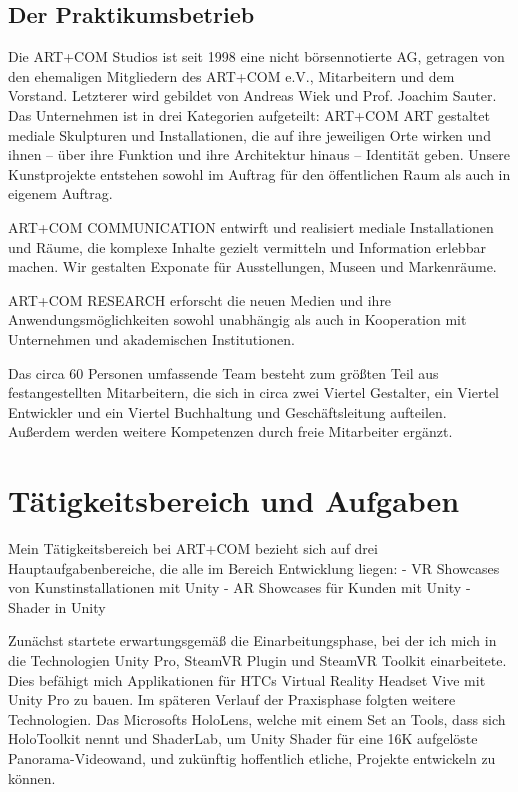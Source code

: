 \documentclass[a4paper,12pt]{scrartcl}
\begin{document}
\subsection{Der Praktikumsbetrieb}
Die ART+COM Studios ist seit 1998 eine nicht börsennotierte AG, getragen von den ehemaligen Mitgliedern des ART+COM e.V., Mitarbeitern und dem Vorstand. Letzterer wird gebildet von Andreas Wiek und Prof. Joachim Sauter.
\newline
Das Unternehmen ist in drei Kategorien aufgeteilt:
\newline
\newline
ART+COM ART gestaltet mediale Skulpturen und Installationen, die auf ihre jeweiligen Orte wirken und ihnen – über ihre Funktion und ihre Architektur hinaus – Identität geben. Unsere Kunstprojekte entstehen sowohl im Auftrag für den öffentlichen Raum als auch in eigenem Auftrag.

ART+COM COMMUNICATION entwirft und realisiert mediale Installationen und Räume, die komplexe Inhalte gezielt vermitteln und Information erlebbar machen. Wir gestalten Exponate für Ausstellungen, Museen und Markenräume.

ART+COM RESEARCH erforscht die neuen Medien und ihre Anwendungsmöglichkeiten sowohl unabhängig als auch in Kooperation mit Unternehmen und akademischen Institutionen.

Das circa 60 Personen umfassende Team besteht zum größten Teil aus festangestellten Mitarbeitern, die sich in circa zwei Viertel Gestalter, ein Viertel Entwickler und ein Viertel Buchhaltung und Geschäftsleitung aufteilen. Außerdem werden weitere Kompetenzen durch freie Mitarbeiter ergänzt.

\section{Tätigkeitsbereich und Aufgaben}

Mein Tätigkeitsbereich bei ART+COM bezieht sich auf drei Hauptaufgabenbereiche, die alle im Bereich Entwicklung liegen:
\newline
\newline
- VR Showcases von Kunstinstallationen mit Unity
- AR Showcases für Kunden mit Unity
- Shader in Unity

Zunächst startete erwartungsgemäß die Einarbeitungsphase, bei der ich mich in die Technologien Unity Pro, SteamVR Plugin und SteamVR Toolkit einarbeitete. Dies befähigt mich Applikationen für HTCs Virtual Reality Headset Vive mit Unity Pro zu bauen.
Im späteren Verlauf der Praxisphase folgten weitere Technologien. Das Microsofts HoloLens, welche mit einem Set an Tools, dass sich HoloToolkit nennt und ShaderLab, um Unity Shader für eine 16K aufgelöste Panorama-Videowand, und zukünftig hoffentlich etliche, Projekte entwickeln zu können.
\end{document}
